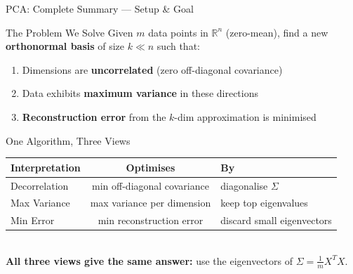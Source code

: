 \documentclass{beamer}
\begin{document}
\begin{frame}[shrink=10]{PCA: Complete Summary --- Setup \& Goal}
  \begin{block}{The Problem We Solve}
    Given $m$ data points in $\mathbb{R}^n$ (zero-mean),
    find a new \textbf{orthonormal basis} of size $k\ll n$ such that:
    \begin{enumerate}\setlength\itemsep{5pt}
      \item Dimensions are \textbf{uncorrelated} (zero off-diagonal
            covariance)
      \item Data exhibits \textbf{maximum variance} in these directions
      \item \textbf{Reconstruction error} from the $k$-dim
            approximation is minimised
    \end{enumerate}
  \end{block}

  \medskip

  \begin{block}{One Algorithm, Three Views}
    \centering
    \renewcommand{\arraystretch}{1.3}
    \begin{tabular}{lcl}
      \toprule
      \textbf{Interpretation} & \textbf{Optimises} & \textbf{By}\\
      \midrule
      Decorrelation  & min off-diagonal covariance &
                       diagonalise $\Sigma$\\
      Max Variance   & max variance per dimension  &
                       keep top eigenvalues\\
      Min Error      & min reconstruction error    &
                       discard small eigenvectors\\
      \bottomrule
    \end{tabular}\\[6pt]
    \textbf{All three views give the same answer:}
    use the eigenvectors of $\Sigma = \tfrac{1}{m}X^TX$.
  \end{block}
\end{frame}
\end{document}
